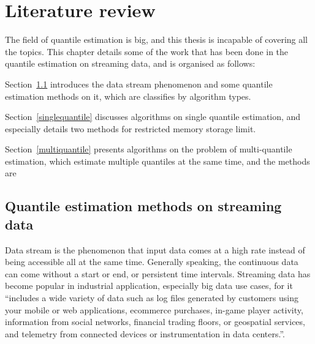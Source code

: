 % 



% 
\chapter{Literature review}
\label{ch: literature_review}


The field of quantile estimation is big, and this thesis is incapable of covering all the topics.
This chapter details some of the work that has been done in the quantile estimation on streaming data, and is organised as follows:

Section~\ref{streamingdata} introduces the data stream phenomenon and some quantile estimation methods on it, which are classifies by algorithm types. 

Section~\ref{singlequantile} discusses algorithms on single quantile estimation, and especially details two methods for restricted memory storage limit.

Section~\ref{multiquantile} presents algorithms on the problem of multi-quantile estimation, which estimate multiple quantiles at the same time, and the methods are 


\section{Quantile estimation methods on streaming data}
\label{streamingdata}
Data stream is the phenomenon that input data comes at a high rate instead of being accessible all at the same time\cite{muthukrishnanDataStreamsAlgorithms2005}.
Generally speaking, the continuous data can come without a start or end, or persistent time intervals.
Streaming data has become popular in industrial application, especially big data use cases, for it
``includes a wide variety of data such as log files generated by customers using your mobile or web applications, ecommerce purchases, in-game player activity, information from social networks, financial trading floors, or geospatial services, and telemetry from connected devices or instrumentation in data centers.''\cite{WhatStreamingData}.

